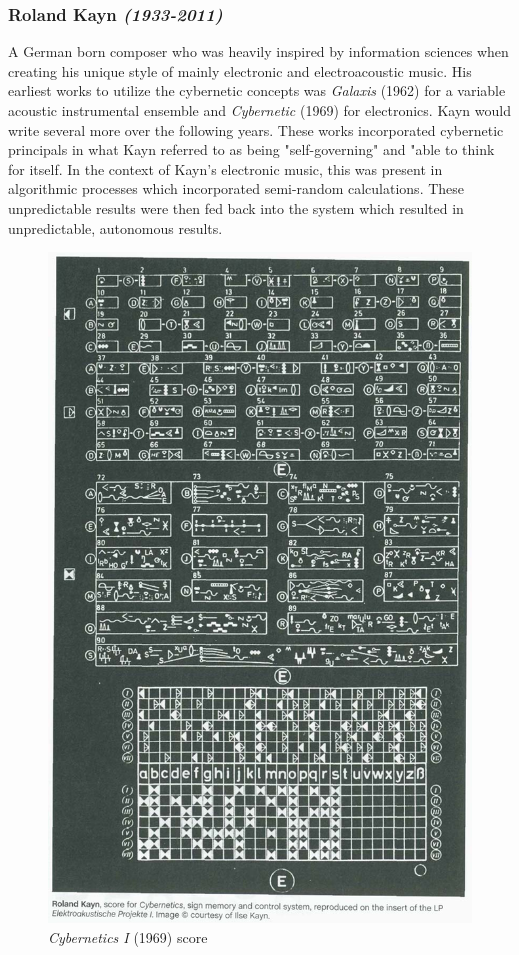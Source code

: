 \subsubsection{Roland Kayn \textit{(1933-2011)}}
A German born composer who was heavily inspired by information sciences when creating his unique style of mainly electronic and electroacoustic music\cite{rolandKaynBio}. His earliest works to utilize the cybernetic concepts was \textit{Galaxis} (1962) for a variable acoustic instrumental ensemble and \textit{Cybernetic} (1969) for electronics. Kayn would write several more over the following years. These works incorporated cybernetic principals in what Kayn referred to as being "self-governing"\cite{rolandKaynBio} and "able to think for itself\cite{Kayn_Elektroakustische_Projekte}. In the context of Kayn's electronic music, this was present in algorithmic processes which incorporated semi-random calculations. These unpredictable results were then fed back into the system which resulted in unpredictable, autonomous results\cite{rolandKaynBio}.

\begin{figure}
    \centering
    \includegraphics[scale=0.45]{diagrams/kayn_cybernetics.jpeg}
    \caption{\textit{Cybernetics I} (1969) score}
    \label{cyberneticsScore}
\end{figure}


